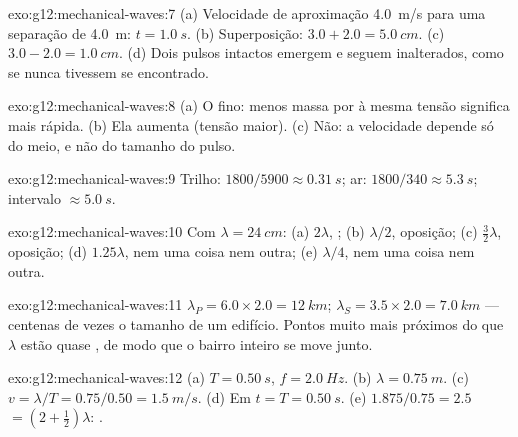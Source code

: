 \begin{solution}{exo:g12:mechanical-waves:7}
(a) Velocidade de aproximação \qty{4.0}{m/s} para uma separação de
\qty{4.0}{m}: $t = \qty{1.0}{s}$. (b) Superposição:
$3.0 + 2.0 = \qty{5.0}{cm}$. (c) $3.0 - 2.0 = \qty{1.0}{cm}$. (d) Dois
pulsos intactos emergem e seguem inalterados, como se nunca tivessem se
encontrado.
\end{solution}

\begin{solution}{exo:g12:mechanical-waves:8}
(a) O fino: menos massa por  à mesma tensão significa  mais
rápida. (b) Ela aumenta (tensão maior). (c) Não: a velocidade depende só
do meio, e não do tamanho do pulso.
\end{solution}

\begin{solution}{exo:g12:mechanical-waves:9}
Trilho: $1800/5900 \approx \qty{0.31}{s}$; ar:
$1800/340 \approx \qty{5.3}{s}$; intervalo $\approx \qty{5.0}{s}$.
\end{solution}

\begin{solution}{exo:g12:mechanical-waves:10}
Com $\lambda = \qty{24}{cm}$: (a) $2\lambda$, ;
(b) $\lambda/2$, oposição; (c) $\tfrac32\lambda$, oposição;
(d) $1.25\lambda$, nem uma coisa nem outra; (e) $\lambda/4$, nem uma
coisa nem outra.
\end{solution}

\begin{solution}{exo:g12:mechanical-waves:11}
$\lambda_P = 6.0 \times 2.0 = \qty{12}{km}$;
$\lambda_S = 3.5 \times 2.0 = \qty{7.0}{km}$ --- centenas de vezes o
tamanho de um edifício. Pontos muito mais próximos do que $\lambda$ estão
quase , de modo que o bairro inteiro se move junto.
\end{solution}

\begin{solution}{exo:g12:mechanical-waves:12}
(a) $T = \qty{0.50}{s}$, $f = \qty{2.0}{Hz}$.
(b) $\lambda = \qty{0.75}{m}$.
(c) $v = \lambda/T = 0.75/0.50 = \qty{1.5}{m/s}$.
(d) Em $t = T = \qty{0.50}{s}$. (e) $1.875/0.75 = 2.5$  $= (2 + \tfrac12)\lambda$: .
\end{solution}

